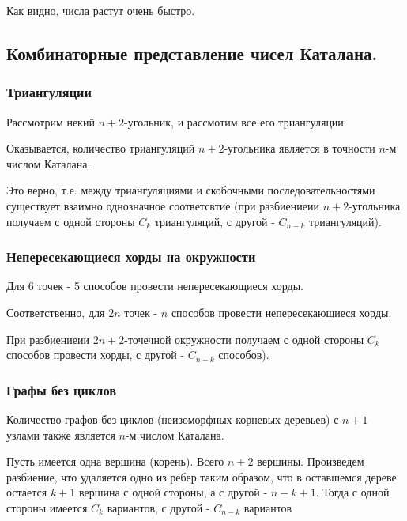 
Как видно, числа растут очень быстро.

\subsection{Комбинаторные представление чисел Каталана.}

\subsubsection{Триангуляции}

Рассмотрим некий $n+2$-угольник, и рассмотим все его триангуляции.


Оказывается, количество триангуляций $n+2$-угольника является в точности $n$-м числом Каталана.

Это верно, т.е. между триангуляциями и скобочными последовательностями существует взаимно однозначное соответсвтие (при разбиениеии $ n+2$-угольника получаем 
с одной стороны $ C_{k} $ триангуляций, с другой - $ C_{n-k} $ триангуляций).

\subsubsection{Непересекающиеся хорды на окружности}


Для 6 точек - 5 способов провести непересекающиеся хорды.

Соответственно, для $ 2n $ точек - $ n $ способов провести непересекающиеся хорды.

При разбиениеии $2n+2$-точечной окружности получаем с одной стороны $ C_{k} $ 
способов провести хорды, с другой - $ C_{n-k} $ способов).

\subsubsection{Графы без циклов}


Количество графов без циклов (неизоморфных корневых деревьев) с $ n+1 $ узлами
также является $n$-м числом Каталана.

Пусть имеется одна вершина (корень).
Всего $ n+2 $ вершины.
Произведем разбиение, что удаляется одно из ребер 
таким образом, что в оставшемся дереве остается $ k+1 $ вершина с одной стороны, 
а с другой - $ n - k + 1 $.
Тогда с одной стороны имеется $ C_{k} $ вариантов, с другой - $ C_{n-k} $ вариантов

